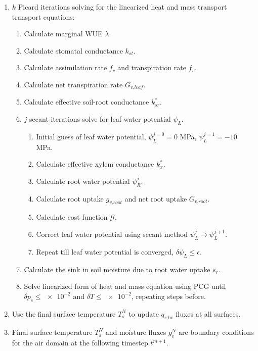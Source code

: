 \begin{enumerate}
	\item $k$ Picard iterations solving for the linearized heat and mass transport transport equations:
		\begin{enumerate}[label=(\alph*)]
			\item Calculate marginal WUE $\lambda$. %
			\item Calculate stomatal conductance $k_{\textit{st}}$.
			\item Calculate assimilation rate $f_c$ and transpiration rate $f_v$.
			\item Calculate net transpiration rate $G_{\textit{v,leaf}}$.
			\item Calculate effective soil-root conductance $k_{sr}^*$.
			\item $j$ secant iterations solve for leaf water potential $\psi_L$.
				\begin{enumerate}[label=(\alph*)]
					\item Initial guess of leaf water potential, $\psi_L^{j=0} = 0$ MPa, $\psi_L^{j=1} = -10$ MPa.
					\item Calculate effective xylem conductance $k_x^*$.
					\item Calculate root water potential $\psi_R^j$.
					\item Calculate root uptake $g_{\textit{v,root}}$ and net root uptake $G_{\textit{v,root}}$.
					\item Calculate cost function $\mathcal{G}$.
					\item Correct leaf water potential using secant method $\psi_L^{j}\rightarrow\psi_L^{j+1}$.
					\item Repeat till leaf water potential is converged, $\delta \psi_L \le \epsilon$.
				\end{enumerate}
			\item Calculate the sink in soil moisture due to root water uptake $s_{r}$.
			\item Solve linearized form of heat and mass equation using PCG until $\delta p_c \le \num{e-2} $ and $\delta T \le  \num{e-2}$, repeating steps before.
		\end{enumerate}
	\item Use the final surface temperature $T_s^{N}$ to update $q_{\textit{r,lw}}$ fluxes at all surfaces.
	\item Final surface temperature $T_s^N$ and moisture fluxes $g_{v}^N$ are boundary conditions for the air domain at the following timestep $t^{m+1}$.
\end{enumerate}
